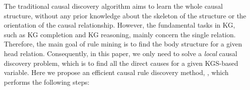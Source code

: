 The traditional causal discovery algorithm aims to learn the whole causal structure, without any prior knowledge about the skeleton of the structure or the orientation of the causal relationship.
However, the fundamental tasks in KG, such as KG completion and KG reasoning, mainly concern the single relation.
Therefore, the main goal of rule mining is to find the body structure for a given head relation.
Consequently, in this paper, we only need to solve a \textit{local} causal discovery problem, which is to find all the direct causes for a given KGS-based variable.
Here we propose an efficient causal rule discovery method, \textit{\dname}, which performs the following steps:

